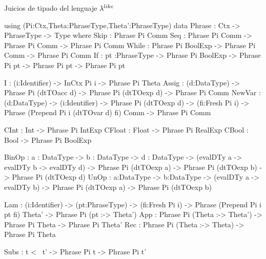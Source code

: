 \newpage

\noindent Juicios de tipado del lenguaje $\lambda^{like}$
\begin{code}
using (Pi:Ctx,Theta:PhraseType,Theta':PhraseType)
    data Phrase : Ctx -> PhraseType -> Type where
        Skip    : Phrase Pi Comm
        Seq     : Phrase Pi Comm -> Phrase Pi Comm -> Phrase Pi Comm
        While   : Phrase Pi BoolExp -> Phrase Pi Comm -> Phrase Pi Comm
        If      : {pt :PhraseType} -> Phrase Pi BoolExp -> 
                  Phrase Pi pt -> Phrase Pi pt -> Phrase Pi pt
        
        I       : (i:Identifier) -> InCtx Pi i -> Phrase Pi Theta
        Assig   : (d:DataType) -> Phrase Pi (dtTOacc d) -> 
                  Phrase Pi (dtTOexp d) -> Phrase Pi Comm
        NewVar : (d:DataType) -> (i:Identifier) -> Phrase Pi (dtTOexp d) -> 
                 (fi:Fresh Pi i) -> Phrase (Prepend Pi i (dtTOvar d) fi) Comm -> 
                 Phrase Pi Comm
        
        CInt    : Int   -> Phrase Pi IntExp
        CFloat  : Float -> Phrase Pi RealExp
        CBool   : Bool  -> Phrase Pi BoolExp
        
        BinOp : {a : DataType} -> {b : DataType} -> {d : DataType} -> 
                (evalDTy a -> evalDTy b -> evalDTy d) -> 
                Phrase Pi (dtTOexp a) -> Phrase Pi (dtTOexp b) -> Phrase Pi (dtTOexp d)
        UnOp  : {a:DataType} -> {b:DataType} -> 
                (evalDTy a -> evalDTy b) -> 
                Phrase Pi (dtTOexp a)  -> Phrase Pi (dtTOexp b) 

        Lam   : (i:Identifier) -> (pt:PhraseType) -> (fi:Fresh Pi i) ->
                Phrase (Prepend Pi i pt fi) Theta' -> 
                Phrase Pi (pt :-> Theta')
        App    : Phrase Pi (Theta :-> Theta') -> Phrase Pi Theta -> 
                 Phrase Pi Theta'
        Rec    : Phrase Pi (Theta :-> Theta) -> Phrase Pi Theta
        
        Subs   : t <~ t' -> Phrase Pi t -> Phrase Pi t'
\end{code}

